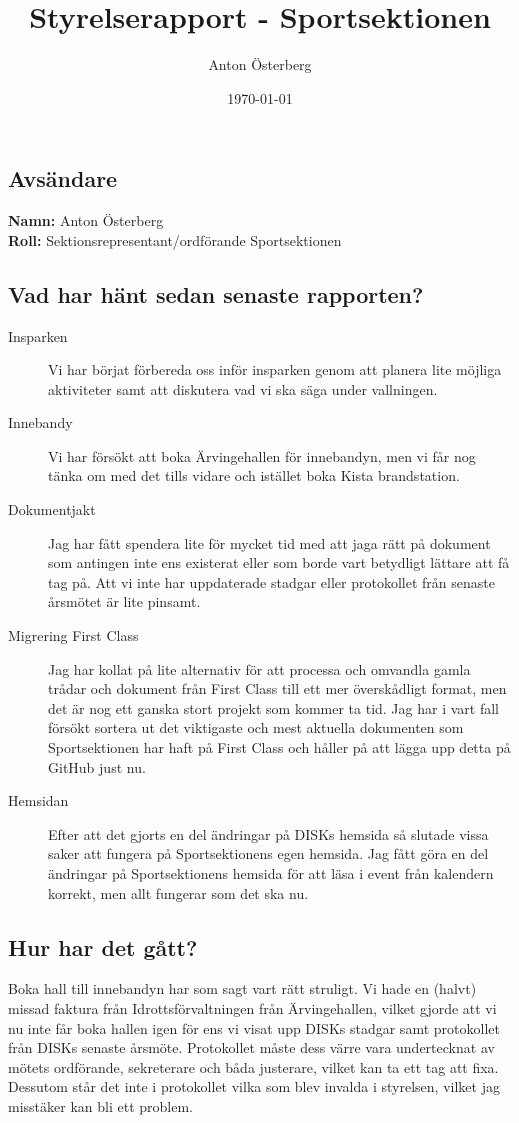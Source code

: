 \documentclass[a4paper]{article}
\begin{document}
	\title{Styrelserapport - Sportsektionen}
	\author{Anton Österberg}
	\date{\today}
	\maketitle

	\null
	\vfill

	\clearpage

	\subsection{Avsändare}
		\textbf{Namn:} Anton Österberg\\
		\textbf{Roll:} Sektionsrepresentant/ordförande Sportsektionen
	\subsection{Vad har hänt sedan senaste rapporten?}
	\begin{description}
		\item[Insparken] Vi har börjat förbereda oss inför insparken genom att planera lite möjliga aktiviteter samt att diskutera vad vi ska säga under vallningen.
		\item[Innebandy] Vi har försökt att boka Ärvingehallen för innebandyn, men vi får nog tänka om med det tills vidare och istället boka Kista brandstation.
		\item[Dokumentjakt] Jag har fått spendera lite för mycket tid med att jaga rätt på dokument som antingen inte ens existerat eller som borde vart betydligt lättare att få tag på. Att vi inte har uppdaterade stadgar eller protokollet från senaste årsmötet är lite pinsamt.
		\item[Migrering First Class] Jag har kollat på lite alternativ för att processa och omvandla gamla trådar och dokument från First Class till ett mer överskådligt format, men det är nog ett ganska stort projekt som kommer ta tid. Jag har i vart fall försökt sortera ut det viktigaste och mest aktuella dokumenten som Sportsektionen har haft på First Class och håller på att lägga upp detta på GitHub just nu.
		\item[Hemsidan] Efter att det gjorts en del ändringar på DISKs hemsida så slutade vissa saker att fungera på Sportsektionens egen hemsida. Jag fått göra en del ändringar på Sportsektionens hemsida för att läsa i event från kalendern korrekt, men allt fungerar som det ska nu.
	\end{description}
	\subsection{Hur har det gått?}
	Boka hall till innebandyn har som sagt vart rätt struligt. Vi hade en (halvt) missad faktura från Idrottsförvaltningen från Ärvingehallen, vilket gjorde att vi nu inte får boka hallen igen för ens vi visat upp DISKs stadgar samt protokollet från DISKs senaste årsmöte. Protokollet måste dess värre vara undertecknat av mötets ordförande, sekreterare och båda justerare, vilket kan ta ett tag att fixa. Dessutom står det inte i protokollet vilka som blev invalda i styrelsen, vilket jag misstäker kan bli ett problem.
\end{document}
